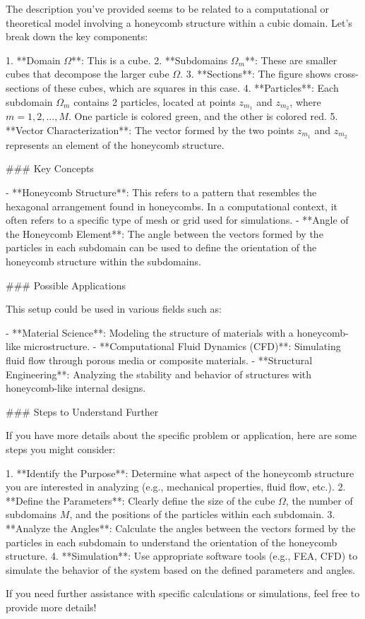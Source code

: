 The description you've provided seems to be related to a computational or theoretical model involving a honeycomb structure within a cubic domain. Let's break down the key components:

1. **Domain \(\Omega\)**: This is a cube.
2. **Subdomains \(\Omega_m\)**: These are smaller cubes that decompose the larger cube \(\Omega\).
3. **Sections**: The figure shows cross-sections of these cubes, which are squares in this case.
4. **Particles**: Each subdomain \(\Omega_m\) contains 2 particles, located at points \(z_{m_1}\) and \(z_{m_2}\), where \(m = 1, 2, ..., M\). One particle is colored green, and the other is colored red.
5. **Vector Characterization**: The vector formed by the two points \(z_{m_1}\) and \(z_{m_2}\) represents an element of the honeycomb structure.

### Key Concepts

- **Honeycomb Structure**: This refers to a pattern that resembles the hexagonal arrangement found in honeycombs. In a computational context, it often refers to a specific type of mesh or grid used for simulations.
- **Angle of the Honeycomb Element**: The angle between the vectors formed by the particles in each subdomain can be used to define the orientation of the honeycomb structure within the subdomains.

### Possible Applications

This setup could be used in various fields such as:

- **Material Science**: Modeling the structure of materials with a honeycomb-like microstructure.
- **Computational Fluid Dynamics (CFD)**: Simulating fluid flow through porous media or composite materials.
- **Structural Engineering**: Analyzing the stability and behavior of structures with honeycomb-like internal designs.

### Steps to Understand Further

If you have more details about the specific problem or application, here are some steps you might consider:

1. **Identify the Purpose**: Determine what aspect of the honeycomb structure you are interested in analyzing (e.g., mechanical properties, fluid flow, etc.).
2. **Define the Parameters**: Clearly define the size of the cube \(\Omega\), the number of subdomains \(M\), and the positions of the particles within each subdomain.
3. **Analyze the Angles**: Calculate the angles between the vectors formed by the particles in each subdomain to understand the orientation of the honeycomb structure.
4. **Simulation**: Use appropriate software tools (e.g., FEA, CFD) to simulate the behavior of the system based on the defined parameters and angles.

If you need further assistance with specific calculations or simulations, feel free to provide more details!
